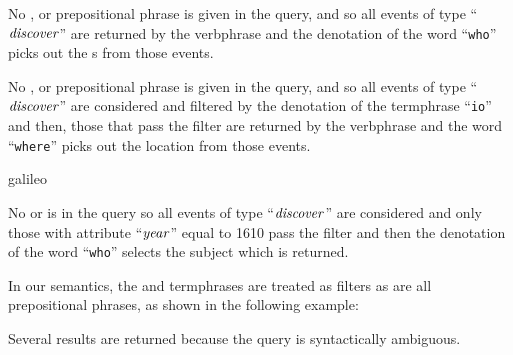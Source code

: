 \documentclass[../main.tex]{subfiles}
\begin{document}
\begin{refsection}
\examplespacing


\examplespacing

\noindent No ,  or prepositional phrase is given in the query, and so all events of type ``$\operatorname{\mathit{discover}}$'' are returned by the verbphrase and the denotation of the word ``\texttt{who}'' picks out the s from those events.

\examplespacing


\examplespacing

\noindent No , or prepositional phrase is given in the query, and so all events of type ``$\operatorname{\mathit{discover}}$'' are considered and filtered by the denotation of the  termphrase ``\texttt{io}'' and then, those that pass the filter are returned by the verbphrase and the word ``\texttt{where}'' picks out the location from those events. %

\examplespacing

 {galileo}

\examplespacing

\noindent No  or  is in the query so all events of type ``$\operatorname{\mathit{discover}}$'' are considered and only those with attribute ``$\operatorname{\mathit{year}}$'' equal to 1610 pass the filter and then the denotation of the word ``\texttt{who}'' selects the subject which is returned.

In our semantics, the  and  termphrases are treated as filters as are all prepositional phrases, as shown in the following example:

\examplespacing


\examplespacing

\noindent Several results are returned because the query is syntactically ambiguous.

\examplespacing



\end{refsection}
\end{document}

